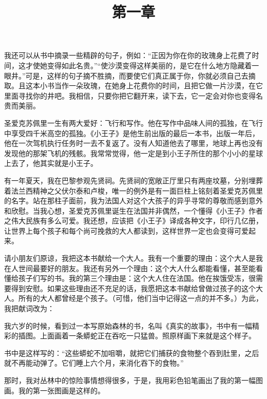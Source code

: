 我还可以从书中摘录一些精辟的句子，例如：“正因为你在你的玫瑰身上花费了时间，这才使她变得如此名贵。”“使沙漠变得这样美丽的，是它在什么地方隐藏着一眼井。”可是，这样的句子摘不胜摘，而要使它们真正属于你，你就必须自己去摘取。且这本小书当作一朵玫瑰，在她身上花费你的时间，且把它做一片沙漠，在它里面寻找你的井吧。我相信，只要你把它翻开来，读下去，它一定会对你也变得名贵而美丽。

圣爱克苏佩里一生有两大爱好：飞行和写作。他在写作中品味人间的孤独，在飞行中享受四千米高空的孤独。《小王子》是他生前出版的最后一本书，出版一年后，他在一次驾机执行任务时一去不复返了。没有人知道他去了哪里，地球上再也没有发现他的那架飞机的残骸。我常常觉得，他一定是到小王子所住的那个小小的星球上去了，他其实就是小王子。

有一年夏天，我在巴黎参观先贤祠。先贤祠的宽敞正厅里只有两座坟墓，分别埋葬着法兰西精神之父伏尔泰和卢梭，唯一的例外是有一面巨柱上铭刻着圣爱克苏佩里的名字。站在那柱子面前，我为法国人对这个大孩子的异乎寻常的尊敬而感到意外和欣慰。当我心想，圣爱克苏佩里诞生在法国并非偶然，一个懂得《小王子》作者之伟大民族有多么可爱。我还想，应该把《小王子》译成各种文字，印行几亿册，让世界上每个孩子和每个尚可挽救的大人都读到，这样世界一定也会变得可爱起来。


请小朋友们原谅，我把这本书献给一个大人。我有一个重要的理由：这个大人是我在人世间最要好的朋友。我还有另外一个理由：这个大人什么都能看懂，甚至能看懂给孩子们写的书。我的第三个理由是：这个大人住在法国。他在挨饿受冻，很需要得到安慰。如果这些理由还不充足的话，我愿把这本书献给曾做过孩子的这个大人。所有的大人都曾经是个孩子。（可惜，他们当中记得这一点的并不多。）为此，我把献词改为：


\title{第一章}

我六岁的时候，看到过一本写原始森林的书，名叫《真实的故事》，书中有一幅精彩的插图。上面画着一条蟒蛇正在吞吃一只猛兽。照原样画下来就是这个样子。

{\startalignment[center]
 \stopalignment}

书中是这样写的：“这些蟒蛇不加咀嚼，就把它们捕获的食物整个吞到肚里，之后就不再能动弹了。它们睡上六个月，来消化吞下的食物。”

那时，我对丛林中的惊险事情想得很多，于是，我用彩色铅笔画出了我的第一幅图画。我的第一张图画是这样的。

{\startalignment[center]
 \stopalignment}

